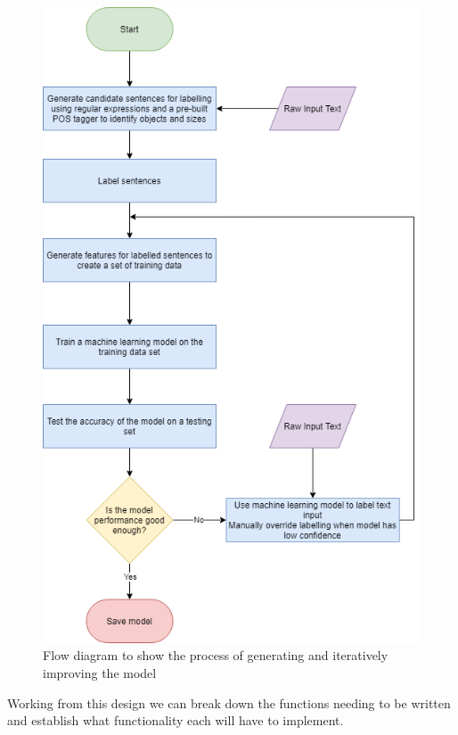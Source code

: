 \documentclass[11pt,oneside]{book}
\begin{document}
\begin{figure}[!htbp]
\centering
\includegraphics[scale=0.33]{figures/ModelFlowDiagram.png}
\caption{Flow diagram to show the process of generating and iteratively improving the model}
\end{figure}

Working from this design we can break down the functions needing to be written and establish what functionality each will have to implement. 
\end{document}
